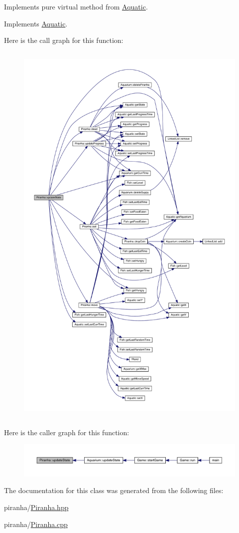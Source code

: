 Implements pure virtual method from \mbox{\hyperlink{class_aquatic}{Aquatic}}. 



Implements \mbox{\hyperlink{class_aquatic_a51e44c95476d72a841fea667c6cbbedc}{Aquatic}}.

Here is the call graph for this function\+:\nopagebreak
\begin{figure}[H]
\begin{center}
\leavevmode
\includegraphics[height=550pt]{class_piranha_a851c302af9de1d6eaf727242e2912f62_cgraph}
\end{center}
\end{figure}
Here is the caller graph for this function\+:\nopagebreak
\begin{figure}[H]
\begin{center}
\leavevmode
\includegraphics[width=350pt]{class_piranha_a851c302af9de1d6eaf727242e2912f62_icgraph}
\end{center}
\end{figure}


The documentation for this class was generated from the following files\+:\begin{DoxyCompactItemize}
\item 
piranha/\mbox{\hyperlink{_piranha_8hpp}{Piranha.\+hpp}}\item 
piranha/\mbox{\hyperlink{_piranha_8cpp}{Piranha.\+cpp}}\end{DoxyCompactItemize}
